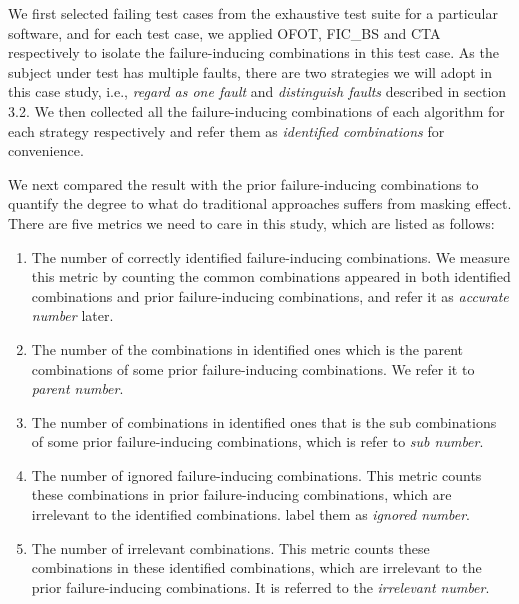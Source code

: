 \documentclass{sig-alternate}
\begin{document}

We first selected failing test cases from the exhaustive test suite for a particular software, and for each test case, we applied OFOT, FIC\_BS and CTA respectively to isolate the failure-inducing combinations in this test case.  As the subject under test has multiple faults, there are two strategies we will adopt in this case study, i.e., \emph{regard as one fault} and \emph{distinguish faults} described in section 3.2. We then collected all the failure-inducing combinations of each algorithm for each strategy respectively and refer them as \emph{identified combinations} for convenience.
%
%

We next compared the result with the prior failure-inducing combinations to quantify the degree to what do traditional approaches suffers from masking effect. There are five metrics we need to care in this study, which are listed as follows:
 \begin{enumerate}
 \item The number of correctly identified failure-inducing combinations. We measure this metric by counting the common combinations appeared in both identified combinations and prior failure-inducing combinations, and refer it as \emph{accurate number} later.
 \item The number of the combinations in identified ones which is the parent combinations of some prior failure-inducing combinations. We refer it to \emph{parent number}.
 \item The number of combinations in identified ones that is the sub combinations of some prior failure-inducing combinations, which is refer to \emph{sub number}.
 \item The number of ignored failure-inducing combinations. This metric counts these combinations in prior failure-inducing combinations, which are irrelevant to the identified combinations. label them as \emph{ignored number}.
 \item The number of irrelevant combinations. This metric counts these combinations in these identified combinations, which are irrelevant to the prior failure-inducing combinations. It is referred to the \emph{irrelevant number}.

\end{enumerate}
\end{document}
